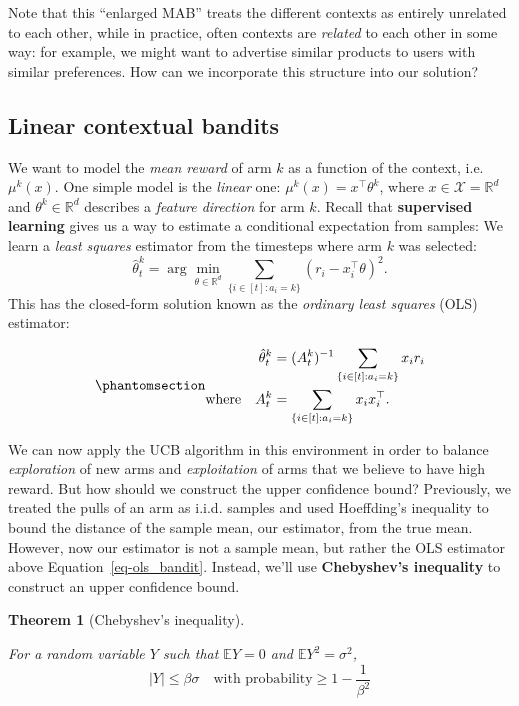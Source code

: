 \documentclass[
  letterpaper,
  DIV=11,
  numbers=noendperiod]{scrreprt}
\theoremstyle{plain}
\theoremstyle{plain}
\newtheorem{theorem}{Theorem}[chapter]
\theoremstyle{definition}
\theoremstyle{definition}
\theoremstyle{remark}
\begin{document}
Note that this ``enlarged MAB'' treats the different contexts as
entirely unrelated to each other, while in practice, often contexts are
\emph{related} to each other in some way: for example, we might want to
advertise similar products to users with similar preferences. How can we
incorporate this structure into our solution?

\subsection{Linear contextual bandits}\label{sec-lin_ucb}

We want to model the \emph{mean reward} of arm \(k\) as a function of
the context, i.e.~\(\mu^k(x)\). One simple model is the \emph{linear}
one: \(\mu^k(x) = x^\top \theta^k\), where
\(x \in \mathcal{X} = \mathbb{R}^d\) and \(\theta^k \in \mathbb{R}^d\)
describes a \emph{feature direction} for arm \(k\). Recall that
\textbf{supervised learning} gives us a way to estimate a conditional
expectation from samples: We learn a \emph{least squares} estimator from
the timesteps where arm \(k\) was selected:
\[\hat \theta_t^k = \arg\min_{\theta \in \mathbb{R}^d} \sum_{\{ i \in [t] : a_i = k \}} (r_i - x_i^\top \theta)^2.\]
This has the closed-form solution known as the \emph{ordinary least
squares} (OLS) estimator:

\begin{equation}\phantomsection\label{eq-ols_bandit}{
\begin{aligned}
    \hat \theta_t^k          & = (A_t^k)^{-1} \sum_{\{ i \in [t] : a_i = k \}} x_i r_i \\
    \text{where} \quad A_t^k & = \sum_{\{ i \in [t] : a_i = k \}} x_i x_i^\top.
\end{aligned}
}\end{equation}

We can now apply the UCB algorithm in this environment in order to
balance \emph{exploration} of new arms and \emph{exploitation} of arms
that we believe to have high reward. But how should we construct the
upper confidence bound? Previously, we treated the pulls of an arm as
i.i.d. samples and used Hoeffding's inequality to bound the distance of
the sample mean, our estimator, from the true mean. However, now our
estimator is not a sample mean, but rather the OLS estimator above
Equation~\ref{eq-ols_bandit}. Instead, we'll use \textbf{Chebyshev's
inequality} to construct an upper confidence bound.

\begin{theorem}[Chebyshev's
inequality]\protect\hypertarget{thm-chebyshev}{}\label{thm-chebyshev}

For a random variable \(Y\) such that \(\mathbb{E}Y = 0\) and
\(\mathbb{E}Y^2 = \sigma^2\),
\[|Y| \le \beta \sigma \quad \text{with probability} \ge 1 - \frac{1}{\beta^2}\]

\end{theorem}
\end{document}
